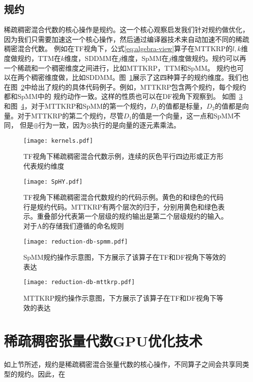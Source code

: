 \subsection{规约}
稀疏稠密混合代数的核心操作是规约。这一个核心观察启发我们针对规约做优化，因为我们只需要加速这一个核心操作，然后通过编译器技术来自动加速不同的稀疏稠密混合代数。
例如在TF视角下，公式\eqref{eq:algebra-view}算子在MTTKRP的$l,k$维度做规约，TTM在$k$维度，SDDMM在$j$维度，SpMM在$j$维度做规约。规约可以再一个稀疏和一个稠密维度之间进行，比如MTTKRP，TTM和SpMM。
规约也可以在两个稠密维度做，比如SDDMM。图~\ref{fig:kernels}展示了这四种算子的规约维度。我们也在图~\ref{fig:four-code}中给出了规约的具体代码例子。例如，MTTKRP包含两个规约，每个规约都和SpMM中的
规约动作一致。这样的性质也可以在DF视角下观察到。 如图~\ref{fig:redb-spmm}和图~\ref{fig:redb-mttkrp}，对于MTTKRP和SpMM的第一个规约，$D_1$的值都是标量，$D_2$的值都是向量。对于MTTKRP的第二个规约，尽管$D_1$的值是一个向量，这一点和SpMM不同，
但是$\oplus$行为一致，因为$\otimes$执行的是向量的逐元素乘法。
\begin{figure}[h]%
  \centering
  \texttt{[image: kernels.pdf]}
  \caption{TF视角下稀疏稠密混合代数示例，连续的灰色平行四边形或正方形代表规约维度}
  \label{fig:kernels}
\end{figure}
\begin{figure}[h]%
  \centering
  \texttt{[image: SpHY.pdf]}
  \caption{TF视角下稀疏稠密混合代数规约的代码示例。黄色的和绿色的代码行是规约代码。MTTKRP有两个层次的归于，分别用黄色和绿色表示。重叠部分代表第一个层级的规约输出是第二个层级规约的输入。对于A的存储我们遵循\cite{kjolstad:2020:phd-thesis}的命名规则}
  \label{fig:four-code}
\end{figure}
\begin{figure}[h]%
  \centering
  \texttt{[image: reduction-db-spmm.pdf]}
  \caption{SpMM规约操作示意图，下方展示了该算子在TF和DF视角下等效的表达}
  \label{fig:redb-spmm}
\end{figure}
\begin{figure}[h]%
  \centering
  \texttt{[image: reduction-db-mttkrp.pdf]}
  \caption{MTTKRP规约操作示意图，下方展示了该算子在TF和DF视角下等效的表达}
  \label{fig:redb-mttkrp}
\end{figure}

\section{稀疏稠密张量代数GPU优化技术}
如上节所述，规约是稀疏稠密混合张量代数的核心操作，不同算子之间会共享同类型的规约。因此，在

